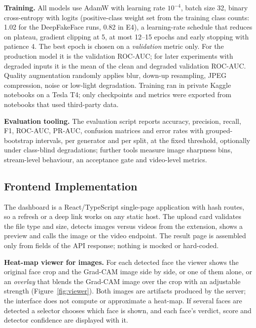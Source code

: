 \textbf{Training.} All models use AdamW \citep{loshchilov2019adamw} with learning rate $10^{-4}$, batch size 32, binary cross-entropy with logits
(positive-class weight set from the training class counts: 1.02 for the DeepFakeFace runs, 0.82 in E4), a learning-rate schedule that reduces on plateau, gradient clipping at 5, at most 12--15 epochs and early stopping with patience 4.
The best epoch is chosen on a \emph{validation} metric only. For the production model it is the validation ROC-AUC; for later experiments with degraded inputs it
is the mean of the clean and degraded validation ROC-AUC. Quality augmentation randomly applies blur, down-up resampling, JPEG compression, noise or low-light degradation.
Training ran in private Kaggle notebooks on a Tesla T4; only checkpoints and metrics were exported from notebooks that used third-party data.

\textbf{Evaluation tooling.} The evaluation script reports accuracy, precision, recall, F1, ROC-AUC, PR-AUC, confusion matrices and error rates
with grouped-bootstrap intervals, per generator and per split, at the fixed threshold, optionally under class-blind degradations; further
tools measure image sharpness bins, stream-level behaviour, an acceptance gate and video-level metrics.

\subsection{Frontend Implementation}
The dashboard is a React/TypeScript single-page application with hash routes, so a refresh or a deep link works on any static host. The
upload card validates the file type and size, detects images versus videos from the extension, shows a preview and calls the image or the video endpoint.
The result page is assembled only from fields of the API response; nothing is mocked or hard-coded.

\textbf{Heat-map viewer for images.} For each detected face the viewer shows the original face crop and the Grad-CAM image side by side, or
one of them alone, or an \emph{overlay} that blends the Grad-CAM image over the crop with an adjustable strength (Figure~\ref{fig:viewer}). Both
images are artifacts produced by the server; the interface does not compute or approximate a heat-map. If several faces are detected a selector
chooses which face is shown, and each face's verdict, score and detector confidence are displayed with it.

